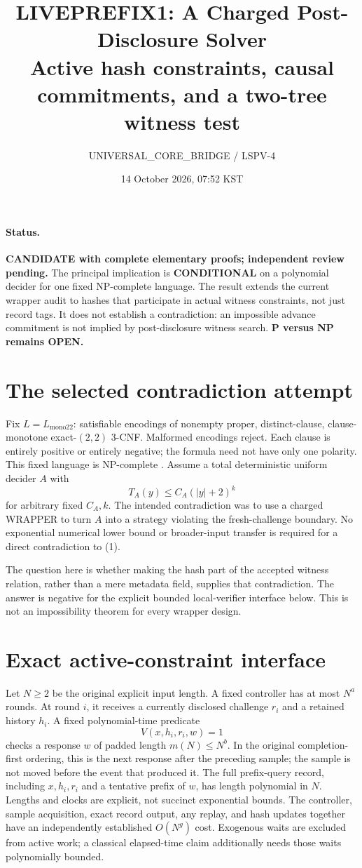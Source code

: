 \documentclass[11pt]{article}
\title{LIVEPREFIX1: A Charged Post-Disclosure Solver\\
\large Active hash constraints, causal commitments, and a two-tree witness test}
\author{UNIVERSAL\_CORE\_BRIDGE / LSPV-4}
\date{14 October 2026, 07:52 KST}
\begin{document}
\maketitle
\paragraph{Status.}
\textbf{CANDIDATE with complete elementary proofs; independent review pending.}
The principal implication is \textbf{CONDITIONAL} on a polynomial decider for
one fixed NP-complete language. The result extends the current wrapper audit
to hashes that participate in actual witness constraints, not just record tags.
It does not establish a contradiction: an impossible advance commitment is
not implied by post-disclosure witness search. \textbf{P versus NP remains OPEN.}

\section{The selected contradiction attempt}
Fix $L=L_{\mathrm{mono22}}$: satisfiable encodings of nonempty proper,
distinct-clause, clause-monotone exact-$(2,2)$ 3-CNF. Malformed encodings reject.
Each clause is entirely positive or entirely negative; the formula need not
have only one polarity. This fixed language is NP-complete \cite{docker}.
Assume a total deterministic uniform decider $A$ with
\[
 T_A(y)\le C_A(|y|+2)^k                                  \tag{1}
\]
for arbitrary fixed $C_A,k$. The intended contradiction was to use a charged
WRAPPER to turn $A$ into a strategy violating the fresh-challenge boundary.
No exponential numerical lower bound or broader-input transfer is required
for a direct contradiction to (1).

The question here is whether making the hash part of the accepted witness
relation, rather than a mere metadata field, supplies that contradiction.
The answer is negative for the explicit bounded local-verifier interface
below. This is not an impossibility theorem for every wrapper design.

\section{Exact active-constraint interface}
Let $N\ge2$ be the original explicit input length. A fixed controller has at
most $N^a$ rounds. At round $i$, it receives a currently disclosed challenge
$r_i$ and a retained history $h_i$. A fixed polynomial-time predicate
\[
 V(x,h_i,r_i,w)=1                                       \tag{2}
\]
checks a response $w$ of padded length $m(N)\le N^b$. In the original
completion-first ordering, this is the next response after the preceding
sample; the sample is not moved before the event that produced it. The full prefix-query
record, including $x,h_i,r_i$ and a tentative prefix of $w$, has length
polynomial in $N$. Lengths and clocks are explicit, not succinct exponential
bounds. The controller, sample acquisition, exact record output, any replay,
and hash updates together have an independently established $O(N^g)$ cost.
Exogenous waits are excluded from active work; a classical elapsed-time
claim additionally needs those waits polynomially bounded.
\end{document}
